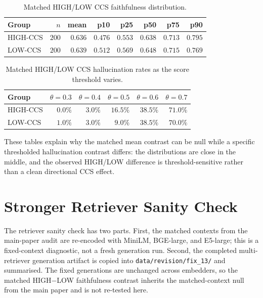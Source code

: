 \documentclass[11pt]{article}
\begin{document}
\begin{table}[!htb]
\centering
\caption{Matched HIGH/LOW CCS faithfulness distribution.}
\footnotesize
\begin{tabular}{lrrrrrrr}
\toprule
Group & $n$ & mean & p10 & p25 & p50 & p75 & p90 \\
\midrule
HIGH-CCS & $200$ & $0.636$ & $0.476$ & $0.553$ & $0.638$ & $0.713$ & $0.795$ \\
LOW-CCS  & $200$ & $0.639$ & $0.512$ & $0.569$ & $0.648$ & $0.715$ & $0.769$ \\
\bottomrule
\end{tabular}
\end{table}

\begin{table}[!htb]
\centering
\caption{Matched HIGH/LOW CCS hallucination rates as the score
threshold varies.}
\footnotesize
\begin{tabular}{lrrrrr}
\toprule
Group & $\theta=0.3$ & $\theta=0.4$ & $\theta=0.5$ & $\theta=0.6$ & $\theta=0.7$ \\
\midrule
HIGH-CCS & $0.0\%$ & $3.0\%$ & $16.5\%$ & $38.5\%$ & $71.0\%$ \\
LOW-CCS  & $1.0\%$ & $3.0\%$ & $\phantom{1}9.0\%$ & $38.5\%$ & $70.0\%$ \\
\bottomrule
\end{tabular}
\end{table}

These tables explain why the matched mean contrast can be null while a
specific thresholded hallucination contrast differs: the distributions
are close in the middle, and the observed HIGH/LOW difference is
threshold-sensitive rather than a clean directional CCS effect.

\section{Stronger Retriever Sanity Check}
\label{supp:retriever}

The retriever sanity check has two parts. First, the matched contexts
from the main-paper audit are re-encoded with MiniLM, BGE-large, and
E5-large; this is a fixed-context diagnostic, not a fresh generation
run. Second, the completed multi-retriever generation artifact is
copied into \texttt{data/revision/fix\_13/} and summarised. The fixed
generations are unchanged across embedders, so the matched
HIGH$-$LOW faithfulness contrast inherits the matched-context null
from the main paper and is not re-tested here.
\end{document}
